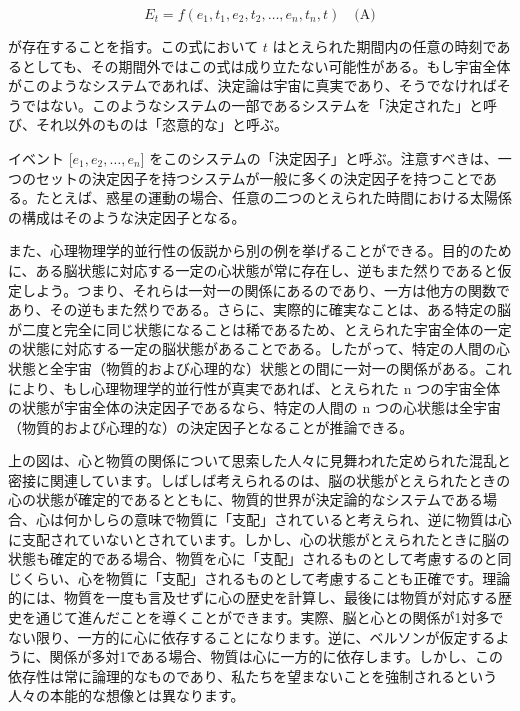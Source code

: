 \documentclass[a4paper,11pt,openany]{ltjsbook}
\begin{document}
\[ E_t = f(e_1, t_1, e_2, t_2, \dots, e_n, t_n, t) \quad \text{(A)} \]

が存在することを指す。この式において $t$ はとえられた期間内の任意の時刻であるとしても、その期間外ではこの式は成り立たない可能性がある。もし宇宙全体がこのようなシステムであれば、決定論は宇宙に真実であり、そうでなければそうではない。このようなシステムの一部であるシステムを「決定された」と呼び、それ以外のものは「恣意的な」と呼ぶ。

イベント [$e_1, e_2, \dots, e_n$] をこのシステムの「決定因子」と呼ぶ。注意すべきは、一つのセットの決定因子を持つシステムが一般に多くの決定因子を持つことである。たとえば、惑星の運動の場合、任意の二つのとえられた時間における太陽係の構成はそのような決定因子となる。

また、心理物理学的並行性の仮説から別の例を挙げることができる。目的のために、ある脳状態に対応する一定の心状態が常に存在し、逆もまた然りであると仮定しよう。つまり、それらは一対一の関係にあるのであり、一方は他方の関数であり、その逆もまた然りである。さらに、実際的に確実なことは、ある特定の脳が二度と完全に同じ状態になることは稀であるため、とえられた宇宙全体の一定の状態に対応する一定の脳状態があることである。したがって、特定の人間の心状態と全宇宙（物質的および心理的な）状態との間に一対一の関係がある。これにより、もし心理物理学的並行性が真実であれば、とえられた n つの宇宙全体の状態が宇宙全体の決定因子であるなら、特定の人間の n つの心状態は全宇宙（物質的および心理的な）の決定因子となることが推論できる。

上の図は、心と物質の関係について思索した人々に見舞われた定められた混乱と密接に関連しています。しばしば考えられるのは、脳の状態がとえられたときの心の状態が確定的であるとともに、物質的世界が決定論的なシステムである場合、心は何かしらの意味で物質に「支配」されていると考えられ、逆に物質は心に支配されていないとされています。しかし、心の状態がとえられたときに脳の状態も確定的である場合、物質を心に「支配」されるものとして考慮するのと同じくらい、心を物質に「支配」されるものとして考慮することも正確です。理論的には、物質を一度も言及せずに心の歴史を計算し、最後には物質が対応する歴史を通じて進んだことを導くことができます。実際、脳と心との関係が1対多でない限り、一方的に心に依存することになります。逆に、ベルソンが仮定するように、関係が多対1である場合、物質は心に一方的に依存します。しかし、この依存性は常に論理的なものであり、私たちを望まないことを強制されるという人々の本能的な想像とは異なります。
\end{document}
